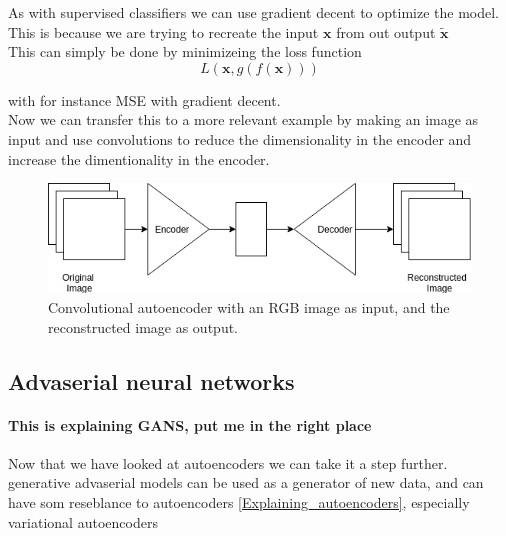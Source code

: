 As with supervised classifiers we can use gradient decent to optimize the model. This is because we are trying to recreate the input $\textbf{x}$ from out output $\widetilde{\textbf{x}}$\\
	  
This can simply be done by minimizeing the loss function\\
\begin{equation}
	L(\textbf{x},g(f(\textbf{x})))
\end{equation}

with for instance MSE with gradient decent. \\
Now we can transfer this to a more relevant example by making an image as input and use convolutions to reduce the dimensionality in the encoder and increase the dimentionality in the encoder.
\begin{figure}[t]
	\centering
	\includegraphics[scale=0.5]{background/figures/CAE.png}
	\caption{Convolutional autoencoder with an RGB image as input, and the reconstructed image as output.}
\end{figure}
	
    \subsection{Advaserial neural networks}
\paragraph{This is explaining GANS, put me in the right place} %
Now that we have looked at autoencoders we can take it a step further. 
generative advaserial models can be used as a generator of new data, and can have som reseblance to autoencoders \ref{Explaining_autoencoders}, especially variational autoencoders %


